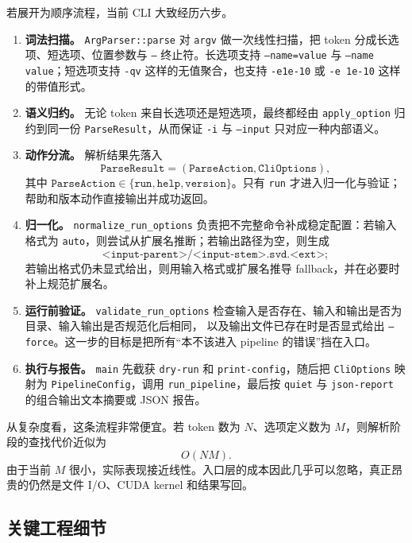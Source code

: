 若展开为顺序流程，当前 CLI 大致经历六步。
\begin{enumerate}
    \item \textbf{词法扫描。} \texttt{ArgParser::parse} 对 \texttt{argv} 做一次线性扫描，把 token 分成长选项、短选项、位置参数与
          \texttt{--} 终止符。长选项支持 \texttt{--name=value} 与 \texttt{--name value}；短选项支持
          \texttt{-qv} 这样的无值聚合，也支持 \texttt{-e1e-10} 或 \texttt{-e 1e-10} 这样的带值形式。
    \item \textbf{语义归约。} 无论 token 来自长选项还是短选项，最终都经由 \texttt{apply\_option} 归约到同一份
          \texttt{ParseResult}，从而保证 \texttt{-i} 与 \texttt{--input} 只对应一种内部语义。
    \item \textbf{动作分流。} 解析结果先落入
          \[
              \texttt{ParseResult}=(\texttt{ParseAction},\texttt{CliOptions}),
          \]
          其中 $\texttt{ParseAction}\in\{\texttt{run},\texttt{help},\texttt{version}\}$。只有 \texttt{run}
          才进入归一化与验证；帮助和版本动作直接输出并成功返回。
    \item \textbf{归一化。} \texttt{normalize\_run\_options} 负责把不完整命令补成稳定配置：若输入格式为
          \texttt{auto}，则尝试从扩展名推断；若输出路径为空，则生成
          \[
              \texttt{<input-parent>/<input-stem>.svd.<ext>};
          \]
          若输出格式仍未显式给出，则用输入格式或扩展名推导 fallback，并在必要时补上规范扩展名。
    \item \textbf{运行前验证。} \texttt{validate\_run\_options} 检查输入是否存在、输入和输出是否为目录、输入输出是否规范化后相同，
          以及输出文件已存在时是否显式给出 \texttt{--force}。这一步的目标是把所有“本不该进入 pipeline 的错误”挡在入口。
    \item \textbf{执行与报告。} \texttt{main} 先截获 \texttt{dry-run} 和 \texttt{print-config}，随后把
          \texttt{CliOptions} 映射为 \texttt{PipelineConfig}，调用 \texttt{run\_pipeline}，最后按
          \texttt{quiet} 与 \texttt{json-report} 的组合输出文本摘要或 JSON 报告。
\end{enumerate}

从复杂度看，这条流程非常便宜。若 token 数为 $N$、选项定义数为 $M$，则解析阶段的查找代价近似为
\[
    O(NM).
\]
由于当前 $M$ 很小，实际表现接近线性。入口层的成本因此几乎可以忽略，真正昂贵的仍然是文件 I/O、CUDA kernel 和结果写回。

\subsection{关键工程细节}

